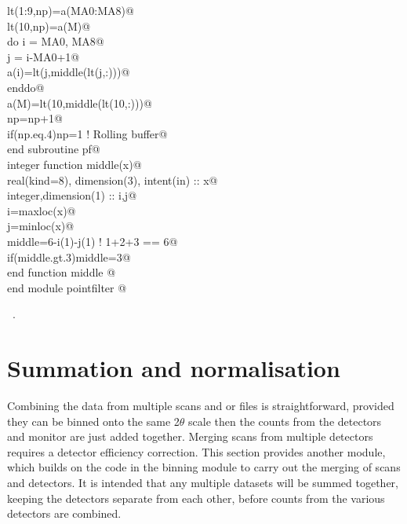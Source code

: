 \documentclass[10pt,a4paper,notitlepage]{article}
\begin{document}
\begin{flushleft}
\begin{minipage}{\linewidth}
\begin{list}{}{}
\mbox{}\verb@      lt(1:9,np)=a(MA0:MA8)@\\
\mbox{}\verb@      lt(10,np)=a(M)@\\
\mbox{}\verb@      do i = MA0, MA8@\\
\mbox{}\verb@         j = i-MA0+1@\\
\mbox{}\verb@         a(i)=lt(j,middle(lt(j,:)))@\\
\mbox{}\verb@      enddo@\\
\mbox{}\verb@      a(M)=lt(10,middle(lt(10,:)))@\\
\mbox{}\verb@      np=np+1@\\
\mbox{}\verb@      if(np.eq.4)np=1 ! Rolling buffer@\\
\mbox{}\verb@      end subroutine pf@\\
\mbox{}\verb@      integer function middle(x)@\\
\mbox{}\verb@      real(kind=8), dimension(3), intent(in) :: x@\\
\mbox{}\verb@      integer,dimension(1) :: i,j@\\
\mbox{}\verb@      i=maxloc(x)@\\
\mbox{}\verb@      j=minloc(x)@\\
\mbox{}\verb@      middle=6-i(1)-j(1) ! 1+2+3 == 6@\\
\mbox{}\verb@      if(middle.gt.3)middle=3@\\
\mbox{}\verb@      end function middle  @\\
\mbox{}\verb@      end module pointfilter                                           @{\NWsep}
\end{list}
\vspace{-1.5ex}
\footnotesize
\begin{list}{}{\setlength{\itemsep}{-\parsep}\setlength{\itemindent}{-\leftmargin}}
\item \NWtxtMacroRefIn\ .

\item{}
\end{list}
\end{minipage}\vspace{4ex}
\end{flushleft}
\section{Summation and normalisation}
Combining the data from multiple scans and or files is straightforward, 
provided they can be binned onto the same 2$\theta$ scale then the counts 
from the detectors and monitor are just added together. 
Merging scans from multiple detectors requires a detector efficiency 
correction. 
This section provides another module, which builds on the code in the binning 
module to carry out the merging of scans and detectors. 
It is intended that any multiple datasets will be summed together, 
keeping the detectors separate from each other, before counts from the various
detectors are combined.
      
\end{document}
